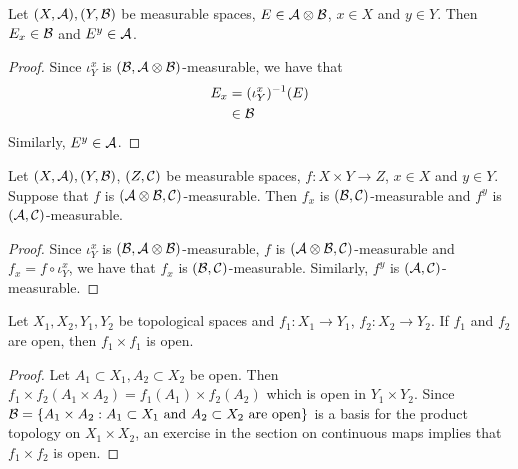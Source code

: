 \documentclass{book}
\begin{document}
	\begin{ex} 
		Let $(X,\mathcal{A}), (Y, \mathcal{B})$ be measurable spaces, $E \in \mathcal{A} \otimes \mathcal{B}$, $x \in X$ and $y \in Y$. Then $E_x \in \mathcal{B}$ and $E^y \in \mathcal{A}$.  
	\end{ex}
	
	\begin{proof}
		Since $\iota^x_Y$ is $(\mathcal{B}, \mathcal{A} \otimes \mathcal{B})$-measurable, we have that
		\begin{align*}
			E_x 
			& = (\iota^x_Y)^{-1}(E) \\
			& \in \mathcal{B} 
		\end{align*}
		Similarly, $E^y \in \mathcal{A}$. 
	\end{proof}
	
	\begin{ex}  
		Let $(X,\mathcal{A}), (Y, \mathcal{B})$, $(Z, \mathcal{C})$ be measurable spaces, $f: X \times Y \rightarrow Z$, $x \in X$ and $y \in Y$. Suppose that $f$ is $(\mathcal{A} \otimes \mathcal{B}, \mathcal{C})$-measurable. Then $f_x$ is $(\mathcal{B}, \mathcal{C})$-measurable and $f^y$ is $(\mathcal{A}, \mathcal{C})$-measurable. 
	\end{ex}
	
	\begin{proof}
		Since $\iota^x_Y$ is $(\mathcal{B}, \mathcal{A} \otimes \mathcal{B})$-measurable, $f$ is $(\mathcal{A} \otimes \mathcal{B}, \mathcal{C})$-measurable and $f_x = f \circ \iota^x_Y$, we have that $f_x$ is $(\mathcal{B}, \mathcal{C})$-measurable. Similarly, $f^y$ is $(\mathcal{A}, \mathcal{C})$-measurable.
	\end{proof}













	
	\begin{ex}
		Let $X_1, X_2,Y_1,Y_2$ be topological spaces and $f_1:X_1 \rightarrow Y_1$, $f_2:X_2 \rightarrow Y_2$. If $f_1$ and $f_2$ are open, then $f_1 \times f_1$ is open.
	\end{ex}
	
	\begin{proof}
		Let $A_1 \subset X_1, A_2 \subset X_2$ be open. Then $f_1 \times f_2(A_1 \times A_2) = f_1(A_1) \times f_2(A_2)$ which is open in $Y_1 \times Y_2$. Since $\mathcal{B} = \{A_1 \times A_2:  \text{$A_1 \subset X_1$ and $A_2 \subset X_2$ are open} \}$ is a basis for the product topology on $X_1 \times X_2$, an exercise in the section on continuous maps implies that $f_1 \times f_2$ is open.
	\end{proof}
	
\end{document}
